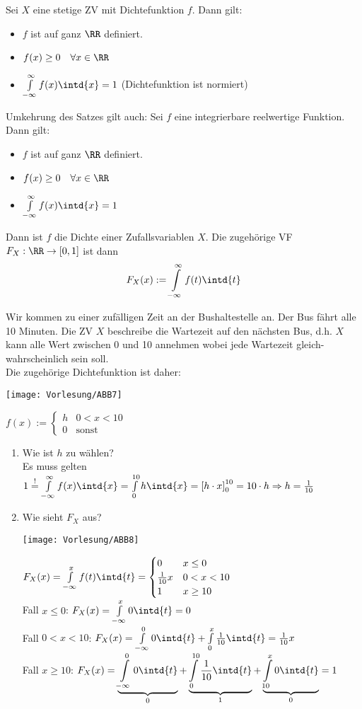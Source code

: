 \documentclass{scrreprt}
\renewenvironment{anumerate}{\begin{enumerate}[label=(\alph*)]}{\end{enumerate}} %
\begin{document}
 Sei $X$ eine stetige ZV mit Dichtefunktion $f$. Dann gilt:
\begin{itemize}
\item $f$ ist auf ganz $\RR$ definiert.
\item $f(x)\geq 0 \quad \forall x \in \RR$
\item $\int\limits_{-\infty}^{\infty}f(x)\intd{x}=1$ (Dichtefunktion ist normiert)
\end{itemize}
Umkehrung des Satzes gilt auch:
 Sei $f$ eine integrierbare reelwertige Funktion. Dann gilt: 
\begin{itemize}
\item $f$ ist auf ganz $\RR$ definiert.
\item $f(x)\geq 0 \quad \forall x \in \RR$
\item $\int\limits_{-\infty}^{\infty}f(x)\intd{x}=1$ 
\end{itemize}
Dann ist $f$ die Dichte einer Zufallsvariablen $X$. Die zugehörige VF $F_X:\RR\to [0,1]$ ist dann
$$F_X(x):=\int\limits_{-\infty}^{\infty} f(t) \intd{t}$$

 Wir kommen zu einer zufälligen Zeit an der Bushaltestelle an. Der Bus fährt alle 10 Minuten. Die ZV $X$ beschreibe die Wartezeit auf den nächsten Bus, d.h. $X$ kann alle Wert zwischen 0 und 10 annehmen wobei jede Wartezeit gleich-wahrscheinlich sein soll.\\
Die zugehörige Dichtefunktion ist daher:
\begin{center}
\texttt{[image: Vorlesung/ABB7]}
\end{center}
$f(x):=\begin{cases}
h & 0 < x < 10\\
0 & \text{sonst}
\end{cases}$
\begin{anumerate}
\item Wie ist $h$ zu wählen?\\
Es muss gelten $1\overset{!}{=}\int\limits_{-\infty}^{\infty}f(x)\intd{x}=\int\limits_0^{10}h\intd{x}=\left[ h\cdot x\right]_0^{10}=10\cdot h \Rightarrow h = \frac{1}{10}$
\item Wie sieht $F_X$ aus?
\begin{center}
\texttt{[image: Vorlesung/ABB8]}
\end{center}
$F_X(x)=\int\limits_{-\infty}^x f(t) \intd{t}=\begin{cases}
0 & x\leq 0\\
\tfrac{1}{10} x & 0 < x < 10\\
1 & x \geq 10
\end{cases}$\\
Fall $x\leq 0$: $F_X(x)=\int\limits_{-\infty}^x 0 \intd{t} = 0$\\
Fall $0<x<10$: $F_X(x)= \int\limits_{-\infty}^0 0 \intd{t} + \int\limits_0^x \frac{1}{10} \intd{t} = \frac{1}{10}x$\\
Fall $x \geq 10$: $F_X(x) = \underbrace{\int\limits_{-\infty}^0 0 \intd{t}}_{0}+ \underbrace{\int\limits_0^{10} \frac{1}{10} \intd{t}}_1 + \underbrace{\int\limits_{10}^x 0 \intd{t}}_0 = 1$
\end{anumerate}
\end{document}
